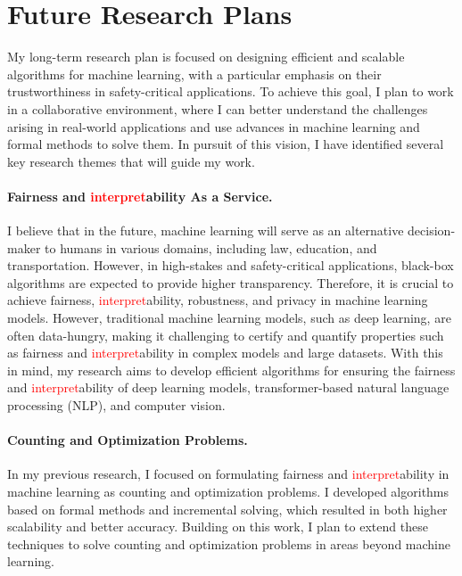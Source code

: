 \documentclass[10pt]{article}
\newcommand{\red}[1]{\textcolor{red}{#1}}
\begin{document}
	

	
	\section*{Future Research Plans}
	 My long-term research plan is focused on designing efficient and scalable algorithms for machine learning, with a particular emphasis on their trustworthiness in safety-critical applications. To achieve this goal, I plan to work in a collaborative environment, where I can better understand the challenges arising in real-world applications and use advances in machine learning and formal methods to solve them. In pursuit of this vision, I have identified several key research themes that will guide my work.
	 
	 
	 \paragraph{Fairness and \red{interpret}ability As a Service.} I believe that in the future, machine learning will serve as an alternative decision-maker to humans in various domains, including law, education, and transportation. However, in high-stakes and safety-critical applications, black-box algorithms are expected to provide higher transparency. Therefore, it is crucial to achieve fairness, \red{interpret}ability, robustness, and privacy in machine learning models. However, traditional machine learning models, such as deep learning, are often data-hungry, making it challenging to certify and quantify properties such as fairness and \red{interpret}ability in complex models and large datasets. With this in mind, my research aims to develop efficient algorithms for ensuring the fairness and \red{interpret}ability of deep learning models, transformer-based natural language processing (NLP), and computer vision. 
	 
	 
	 \paragraph{Counting and Optimization Problems.} In my previous research, I focused on formulating fairness and \red{interpret}ability in machine learning as counting and optimization problems. I developed algorithms based on formal methods and incremental solving, which resulted in both higher scalability and better accuracy. Building on this work, I plan to extend these techniques to solve counting and optimization problems in areas beyond machine learning.
	
	\small
	
	
\end{document}
